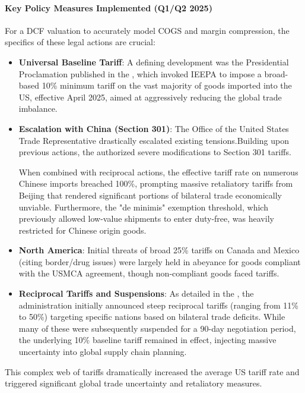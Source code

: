 \paragraph{Key Policy Measures Implemented (Q1/Q2 2025)}
For a DCF valuation to accurately model COGS and margin compression, the specifics of these legal actions are crucial:
\begin{itemize}
    \item \textbf{Universal Baseline Tariff}: A defining development was the Presidential Proclamation published in the \textcite{federalregister2025baseline}, which invoked IEEPA to impose a broad-based 10\% minimum tariff on the vast majority of goods imported into the US, effective April 2025, aimed at aggressively reducing the global trade imbalance.
    \item \textbf{Escalation with China (Section 301)}: The Office of the United States Trade Representative drastically escalated existing tensions.\newline Building upon previous actions, the \textcite{ustr2025section301} authorized severe modifications to Section 301 tariffs.

          When combined with reciprocal actions, the effective tariff rate on numerous Chinese imports breached 100\%, prompting massive retaliatory tariffs from Beijing that rendered significant portions of bilateral trade economically unviable. Furthermore, the "de minimis" exemption threshold, which previously allowed low-value shipments to enter duty-free, was heavily restricted for Chinese origin goods.
    \item \textbf{North America}: Initial threats of broad 25\% tariffs on Canada and Mexico (citing border/drug issues) were largely held in abeyance for goods compliant with the USMCA agreement, though non-compliant goods faced tariffs.
    \item \textbf{Reciprocal Tariffs and Suspensions}: As detailed in the \textcite{federalregister2025reciprocal}, the administration initially announced steep reciprocal tariffs (ranging from 11\% to 50\%) targeting specific nations based on bilateral trade deficits. While many of these were subsequently suspended for a 90-day negotiation period, the underlying 10\% baseline tariff remained in effect, injecting massive uncertainty into global supply chain planning.
\end{itemize}

This complex web of tariffs dramatically increased the average US tariff rate and triggered significant global trade uncertainty and retaliatory measures.

